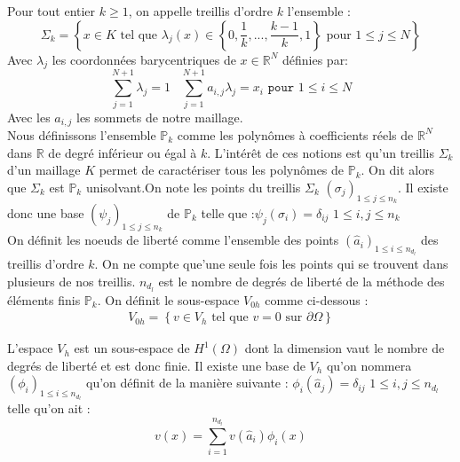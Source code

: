 Pour tout entier $k\geq 1$, on appelle treillis d'ordre $k$ l'ensemble :\\
\begin{equation*}
\Sigma_{k}=\left\{ x\in K \text{ tel que } \lambda_{j}\left(x\right)\in\left\{0, \frac{1}{k},...,\frac{k-1}{k}, 1\right\} \text{ pour }1\leq j\leq N\right\}
\end{equation*}
Avec $\lambda_{j}$ les coordonnées barycentriques de $x\in\mathbb{R}^{N}$ définies par:\\
\begin{equation*}
\sum_{j=1}^{N+1}\lambda_{j}=1 \;\;\;\sum_{j=1}^{N+1}a_{i,j}\lambda_{j}=x_{i} \texttt{ pour } 1\leq i \leq N
\end{equation*}
Avec les $a_{i,j}$ les sommets de notre maillage.\\

Nous définissons l'ensemble $\mathbb{P}_{k}$ comme les polynômes à coefficients réels de $\mathbb{R}^{N}$ dans $\mathbb{R}$ de degré inférieur ou égal à $k$. L'intérêt de ces notions est qu'un treillis $\Sigma_{k}$ d'un maillage $K$ permet de caractériser tous les polynômes de $\mathbb{P}_{k}$. On dit alors que $\Sigma_{k}$ est $\mathbb{P}_{k}$ unisolvant.On note les points du treillis $\Sigma_{k}$  $\left(\sigma_{j}\right)_{1\leq j\leq n_{k}}$. Il existe donc une base $\left(\psi_{j}\right)_{1\leq j\leq n_{k}}$ de $\mathbb{P}_{k}$ telle que :$\psi_{j}\left(\sigma_{i}\right)=\delta_{ij}$  $1\leq i, j\leq n_{k}$\\

On définit les noeuds de liberté comme l'ensemble des points $\left(\hat{a}_{i}\right)_{1\leq i\leq n_{d_{l}}}$ des treillis d'ordre $k$. On ne compte que'une seule fois les points qui se trouvent dans plusieurs de nos treillis. $n_{d_{l}}$ est le nombre de degrés de liberté de la méthode des éléments finis $\mathbb{P}_{k}$. On définit le sous-espace $V_{0h}$ comme ci-dessous :\\
\begin{align*}
V_{0h}=\left\{v\in V_{h} \text{ tel que } v=0 \text{ sur } \partial\Omega\right\}
\end{align*}

L'espace $V_{h}$  est un sous-espace de $H^{1}\left(\Omega\right)$ dont la dimension vaut le nombre de degrés de liberté et est donc finie. Il existe une base de $V_{h}$ qu'on nommera $\left(\phi_{i}\right)_{1\leq i\leq n_{d_{l}}}$ qu'on définit de la manière suivante : $\phi_{i}\left(\hat{a}_{j}\right)=\delta_{ij}$  $1\leq i, j\leq n_{d_{l}}$ telle qu'on ait :
\begin{equation*}
v(x)=\sum_{i=1}^{n_{d_{l}}}v\left(\hat{a}_{i}\right)\phi_{i}\left(x\right)
\end{equation*}

